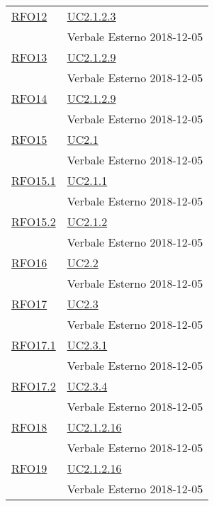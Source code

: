 \begin{longtable}{|>{\centering}m{5cm}|m{5cm}<{\centering}|}
	\hyperlink{RFO12}{RFO12} & \hyperref[UC2.1.2.3]{UC2.1.2.3}\\& Verbale Esterno 2018-12-05\\ \hline
	
	\hyperlink{RFO13}{RFO13} & \hyperref[UC2.1.2.9]{UC2.1.2.9}\\& Verbale Esterno 2018-12-05\\ \hline
	
	\hyperlink{RFO14}{RFO14} & \hyperref[UC2.1.2.9]{UC2.1.2.9}\\& Verbale Esterno 2018-12-05\\ \hline
	
	\hyperlink{RFO15}{RFO15} & \hyperref[UC2.1]{UC2.1}\\& Verbale Esterno 2018-12-05\\ \hline
	
	\hyperlink{RFO15.1}{RFO15.1} & \hyperref[UC2.1.1]{UC2.1.1}\\& Verbale Esterno 2018-12-05\\ \hline
	
	\hyperlink{RFO15.2}{RFO15.2} & \hyperref[UC2.1.2]{UC2.1.2}\\& Verbale Esterno 2018-12-05\\ \hline
	
	\hyperlink{RFO16}{RFO16} & \hyperref[UC2.2]{UC2.2}\\& Verbale Esterno 2018-12-05\\ \hline
	
	\hyperlink{RFO17}{RFO17} & \hyperref[UC2.3]{UC2.3}\\& Verbale Esterno 2018-12-05\\ \hline
	
	\hyperlink{RFO17.1}{RFO17.1} & \hyperref[UC2.3.1]{UC2.3.1}\\& Verbale Esterno 2018-12-05\\ \hline
	
	\hyperlink{RFO17.2}{RFO17.2} & \hyperref[UC2.3.4]{UC2.3.4}\\& Verbale Esterno 2018-12-05\\ \hline
	
	\hyperlink{RFO18}{RFO18} & \hyperref[UC2.1.2.16]{UC2.1.2.16}\\& Verbale Esterno 2018-12-05\\ \hline
	
	\hyperlink{RFO19}{RFO19} & \hyperref[UC2.1.2.16]{UC2.1.2.16}\\& Verbale Esterno 2018-12-05\\ \hline
	

\end{longtable}

